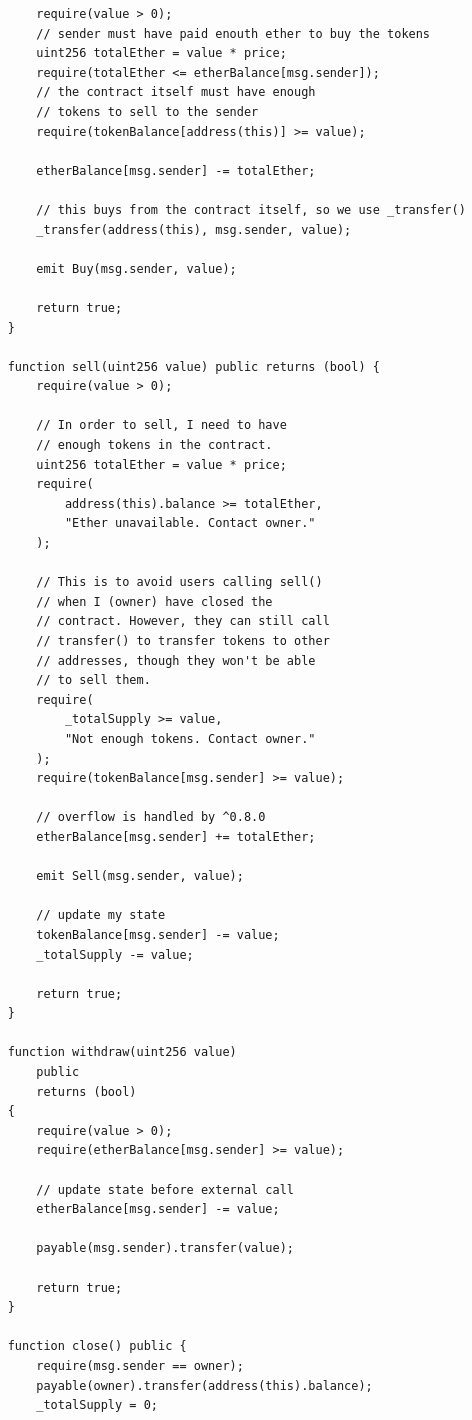 \documentclass[12pt,addpoints,answers]{exam}
\begin{document}
\begin{questions}
\begin{parts}
\begin{solution}
\begin{verbatim}
        require(value > 0);
        // sender must have paid enouth ether to buy the tokens
        uint256 totalEther = value * price;
        require(totalEther <= etherBalance[msg.sender]);
        // the contract itself must have enough
        // tokens to sell to the sender
        require(tokenBalance[address(this)] >= value);

        etherBalance[msg.sender] -= totalEther;

        // this buys from the contract itself, so we use _transfer()
        _transfer(address(this), msg.sender, value);

        emit Buy(msg.sender, value);

        return true;
    }

    function sell(uint256 value) public returns (bool) {
        require(value > 0);

        // In order to sell, I need to have
        // enough tokens in the contract.
        uint256 totalEther = value * price;
        require(
            address(this).balance >= totalEther,
            "Ether unavailable. Contact owner."
        );

        // This is to avoid users calling sell()
        // when I (owner) have closed the
        // contract. However, they can still call
        // transfer() to transfer tokens to other
        // addresses, though they won't be able
        // to sell them.
        require(
            _totalSupply >= value,
            "Not enough tokens. Contact owner."
        );
        require(tokenBalance[msg.sender] >= value);

        // overflow is handled by ^0.8.0
        etherBalance[msg.sender] += totalEther;

        emit Sell(msg.sender, value);

        // update my state
        tokenBalance[msg.sender] -= value;
        _totalSupply -= value;

        return true;
    }

    function withdraw(uint256 value)
        public
        returns (bool)
    {
        require(value > 0);
        require(etherBalance[msg.sender] >= value);

        // update state before external call
        etherBalance[msg.sender] -= value;

        payable(msg.sender).transfer(value);

        return true;
    }

    function close() public {
        require(msg.sender == owner);
        payable(owner).transfer(address(this).balance);
        _totalSupply = 0;


\end{verbatim}
\end{solution}
\end{parts}
\end{questions}
\end{document}

